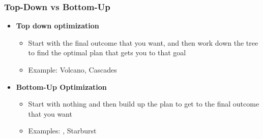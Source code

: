 \documentclass[11pt]{article}
\begin{document}
\begin{itemize}
        \subsubsection*{Top-Down vs Bottom-Up}
        \begin{itemize}
            \item \textbf{Top down optimization}
            \begin{itemize}
                \item Start with the final outcome that you want, and then work down the tree to find the optimal plan that gets you to that goal
                \item Example: Volcano, Cascades
            \end{itemize}

            \item \textbf{Bottom-Up Optimization}
            \begin{itemize}
                \item Start with nothing and then build up the plan to get to the final outcome that you want
                \item Examples: , Starburst
            \end{itemize}
        \end{itemize}

    \end{itemize}

\newpage


\end{document}
